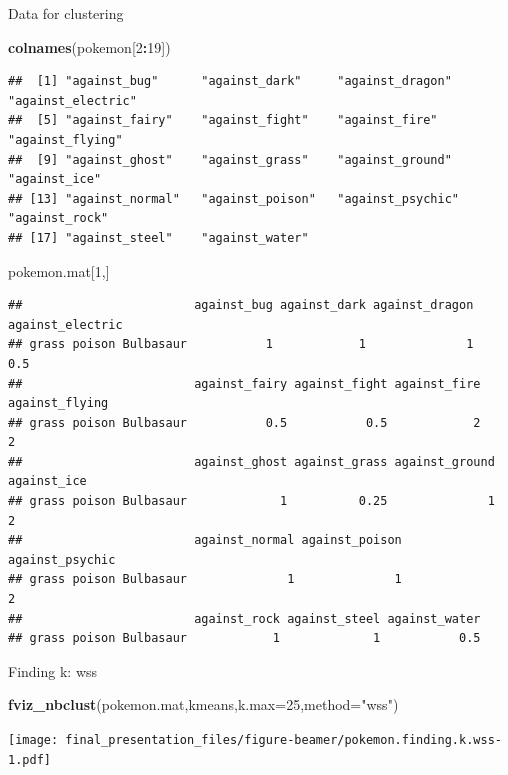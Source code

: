 \documentclass[
  ignorenonframetext,
]{beamer}
\newenvironment{Shaded}{\begin{snugshade}}{\end{snugshade}}
\newcommand{\DataTypeTok}[1]{\textcolor[rgb]{0.13,0.29,0.53}{#1}}
\newcommand{\DecValTok}[1]{\textcolor[rgb]{0.00,0.00,0.81}{#1}}
\newcommand{\KeywordTok}[1]{\textcolor[rgb]{0.13,0.29,0.53}{\textbf{#1}}}
\newcommand{\NormalTok}[1]{#1}
\newcommand{\OperatorTok}[1]{\textcolor[rgb]{0.81,0.36,0.00}{\textbf{#1}}}
\newcommand{\StringTok}[1]{\textcolor[rgb]{0.31,0.60,0.02}{#1}}
\begin{document}
\begin{frame}[fragile]{Data for clustering}
\protect\hypertarget{data-for-clustering}{}

\begin{Shaded}
\begin{Highlighting}[]
\KeywordTok{colnames}\NormalTok{(pokemon[}\DecValTok{2}\OperatorTok{:}\DecValTok{19}\NormalTok{])}
\end{Highlighting}
\end{Shaded}

\begin{verbatim}
##  [1] "against_bug"      "against_dark"     "against_dragon"   "against_electric"
##  [5] "against_fairy"    "against_fight"    "against_fire"     "against_flying"  
##  [9] "against_ghost"    "against_grass"    "against_ground"   "against_ice"     
## [13] "against_normal"   "against_poison"   "against_psychic"  "against_rock"    
## [17] "against_steel"    "against_water"
\end{verbatim}

\begin{Shaded}
\begin{Highlighting}[]
\NormalTok{pokemon.mat[}\DecValTok{1}\NormalTok{,]}
\end{Highlighting}
\end{Shaded}

\begin{verbatim}
##                        against_bug against_dark against_dragon against_electric
## grass poison Bulbasaur           1            1              1              0.5
##                        against_fairy against_fight against_fire against_flying
## grass poison Bulbasaur           0.5           0.5            2              2
##                        against_ghost against_grass against_ground against_ice
## grass poison Bulbasaur             1          0.25              1           2
##                        against_normal against_poison against_psychic
## grass poison Bulbasaur              1              1               2
##                        against_rock against_steel against_water
## grass poison Bulbasaur            1             1           0.5
\end{verbatim}

\end{frame}

\begin{frame}[fragile]{Finding k: wss}
\protect\hypertarget{finding-k-wss}{}

\begin{Shaded}
\begin{Highlighting}[]
\KeywordTok{fviz_nbclust}\NormalTok{(pokemon.mat,kmeans,}\DataTypeTok{k.max=}\DecValTok{25}\NormalTok{,}\DataTypeTok{method=}\StringTok{"wss"}\NormalTok{)}
\end{Highlighting}
\end{Shaded}

\texttt{[image: final\_presentation\_files/figure-beamer/pokemon.finding.k.wss-1.pdf]}

\end{frame}
\end{document}
